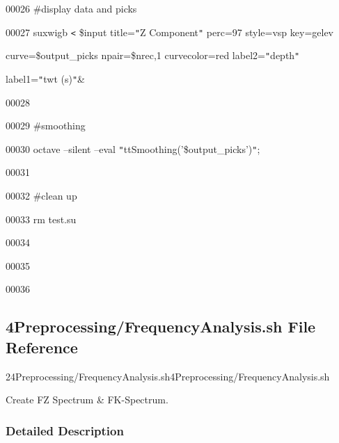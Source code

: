 \documentclass{article}
\begin{document}
\vspace{4pt}
00026 \#display data and picks

\vspace{4pt}
00027 suxwigb \texttt{<} \$input title=\texttt{"}Z Component\texttt{"} perc=97 
style=vsp key=gelev 

\vspace{4pt}
\parindent=18pt
curve=\$output\_picks npair=\$nrec,1 curvecolor=red label2=\texttt{"}depth\texttt{"} 

\vspace{4pt}
label1=\texttt{"}twt (s)\texttt{"}\&

\vspace{4pt}
\parindent=0pt
00028 

\vspace{4pt}
00029 \#smoothing

\vspace{4pt}
00030 octave --silent --eval \texttt{"}ttSmoothing('\$output\_picks')\texttt{"};

\vspace{4pt}
00031 

\vspace{4pt}
00032 \#clean up

\vspace{4pt}
00033 rm test.su

\vspace{4pt}
00034 

\vspace{4pt}
00035 

\vspace{4pt}
00036 \newpage

\newpage
\vspace{12pt}
\subsection*{{\large{}\textbf{4Preprocessing/FrequencyAnalysis.sh File Reference}}}

\vspace{12pt}
24Preprocessing/FrequencyAnalysis.sh4Preprocessing/FrequencyAnalysis.sh\label{AAAAAAAAAJ}

\vspace{12pt}
Create FZ Spectrum \& FK-Spectrum. 

\vspace{24pt}
\subsubsection*{\textbf{Detailed Description}}
\end{document}
